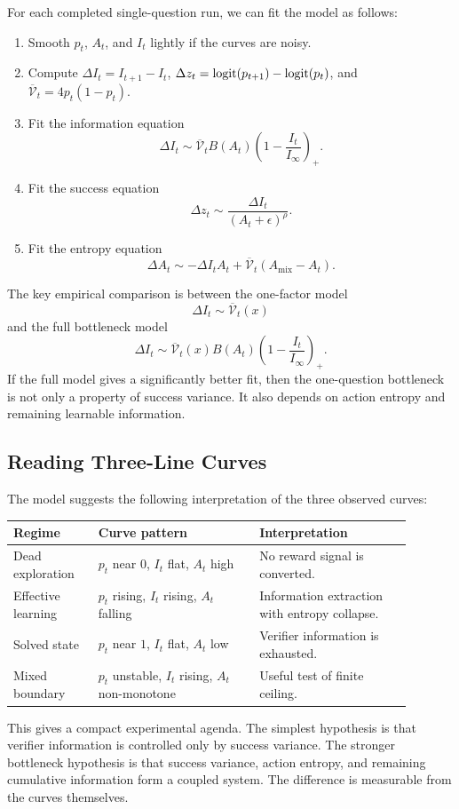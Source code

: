 For each completed single-question run, we can fit the model as follows:
\begin{enumerate}
  \item Smooth $p_t$, $A_t$, and $I_t$ lightly if the curves are noisy.
  \item Compute $\Delta I_t=I_{t+1}-I_t$, $\Delta z_t=\mathrm{logit}(p_{t+1})-\mathrm{logit}(p_t)$, and $\overline{\mathcal{V}}_t=4p_t(1-p_t)$.
  \item Fit the information equation
  \[
    \Delta I_t
    \sim
    \overline{\mathcal{V}}_t B(A_t)\left(1-\frac{I_t}{I_\infty}\right)_+.
  \]
  \item Fit the success equation
  \[
    \Delta z_t
    \sim
    \frac{\Delta I_t}{(A_t+\epsilon)^\rho}.
  \]
  \item Fit the entropy equation
  \[
    \Delta A_t
    \sim
    -\Delta I_t A_t + \overline{\mathcal{V}}_t(A_{\mathrm{mix}}-A_t).
  \]
\end{enumerate}

The key empirical comparison is between the one-factor model
\[
  \Delta I_t\sim \overline{\mathcal{V}}_t(x)
\]
and the full bottleneck model
\[
  \Delta I_t
  \sim
  \overline{\mathcal{V}}_t(x)B(A_t)\left(1-\frac{I_t}{I_\infty}\right)_+.
\]
If the full model gives a significantly better fit, then the one-question bottleneck is not only a property of success variance. It also depends on action entropy and remaining learnable information.

\subsection{Reading Three-Line Curves}

The model suggests the following interpretation of the three observed curves:
\begin{center}
\begin{tabular}{p{0.19\linewidth}p{0.36\linewidth}p{0.34\linewidth}}
\toprule
Regime & Curve pattern & Interpretation \\
\midrule
Dead exploration & $p_t$ near $0$, $I_t$ flat, $A_t$ high & No reward signal is converted. \\
Effective learning & $p_t$ rising, $I_t$ rising, $A_t$ falling & Information extraction with entropy collapse. \\
Solved state & $p_t$ near $1$, $I_t$ flat, $A_t$ low & Verifier information is exhausted. \\
Mixed boundary & $p_t$ unstable, $I_t$ rising, $A_t$ non-monotone & Useful test of finite ceiling. \\
\bottomrule
\end{tabular}
\end{center}

This gives a compact experimental agenda. The simplest hypothesis is that verifier information is controlled only by success variance. The stronger bottleneck hypothesis is that success variance, action entropy, and remaining cumulative information form a coupled system. The difference is measurable from the curves themselves.
